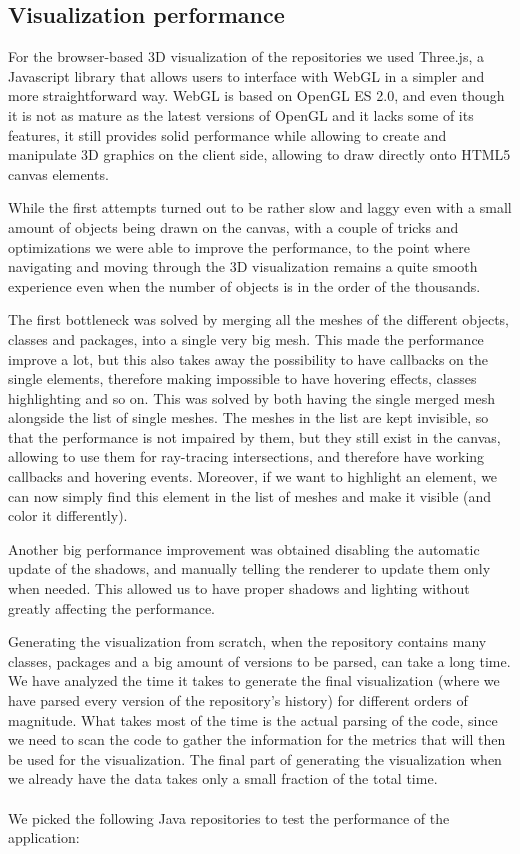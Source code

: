 \documentclass[]{usiinfbachelorproject}
\begin{document}
\subsection{Visualization performance} \label{Visualization performance}

For the browser-based 3D visualization of the repositories we used Three.js, a Javascript library that allows users to interface with WebGL in a simpler and more straightforward way. WebGL is based on OpenGL ES 2.0, and even though it is not as mature as the latest versions of OpenGL and it lacks some of its features, it still provides solid performance while allowing to create and manipulate 3D graphics on the client side, allowing to draw directly onto HTML5 canvas elements.

While the first attempts turned out to be rather slow and laggy even with a small amount of objects being drawn on the canvas, with a couple of tricks and optimizations we were able to improve the performance, to the point where navigating and moving through the 3D visualization remains a quite smooth experience even when the number of objects is in the order of the thousands.

The first bottleneck was solved by merging all the meshes of the different objects, classes and packages, into a single very big mesh. This made the performance improve a lot, but this also takes away the possibility to have callbacks on the single elements, therefore making impossible to have hovering effects, classes highlighting and so on. This was solved by both having the single merged mesh alongside the list of single meshes. The meshes in the list are kept invisible, so that the performance is not impaired by them, but they still exist in the canvas, allowing to use them for ray-tracing intersections, and therefore have working callbacks and hovering events. Moreover, if we want to highlight an element, we can now simply find this element in the list of meshes and make it visible (and color it differently).

Another big performance improvement was obtained disabling the automatic update of the shadows, and manually telling the renderer to update them only when needed. This allowed us to have proper shadows and lighting without greatly affecting the performance.

Generating the visualization from scratch, when the repository contains many classes, packages and a big amount of versions to be parsed, can take a long time. We have analyzed the time it takes to generate the final visualization (where we have parsed every version of the repository's history) for different orders of magnitude. What takes most of the time is the actual parsing of the code, since we need to scan the code to gather the information for the metrics that will then be used for the visualization. The final part of generating the visualization when we already have the data takes only a small fraction of the total time.\\\\
We picked the following Java repositories to test the performance of the application:
\end{document}
